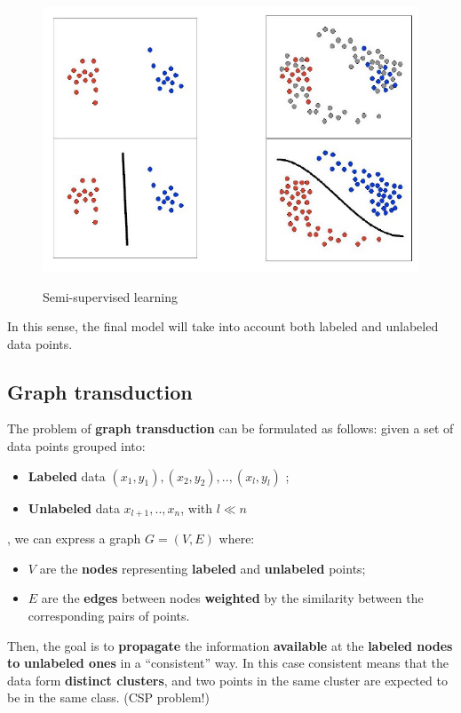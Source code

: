 \begin{figure}[h!]
    \centering
    \includegraphics[scale = 1.4]{img/camc4.jpg}
    \label{camc4}
    \caption{Semi-supervised learning}
\end{figure}

In this sense, the final model will take into account both labeled and unlabeled data points.

\subsection{Graph transduction}
The problem of \textbf{graph transduction} can be formulated as follows: given a set of data points grouped into:

\begin{itemize}
    \item \textbf{Labeled} data ${(x_1, y_1), (x_2, y_2), .., (x_l, y_l)}$ ;
    \item \textbf{Unlabeled} data $x_{l+1}, .., x_n$, with $l \ll n$
\end{itemize}

, we can express a graph $G = (V,E)$ where:

\begin{itemize}
    \item $V$ are the \textbf{nodes} representing \textbf{labeled} and \textbf{unlabeled} points;
    \item $E$ are the \textbf{edges} between nodes \textbf{weighted} by the similarity between the corresponding pairs of points.
\end{itemize}

Then, the goal is to \textbf{propagate} the information \textbf{available} at the \textbf{labeled nodes} \textbf{to} \textbf{unlabeled ones} in a “consistent” way. In this case consistent means that the data form \textbf{distinct clusters}, and two points in the same cluster are expected to be in the same class. (CSP problem!)

